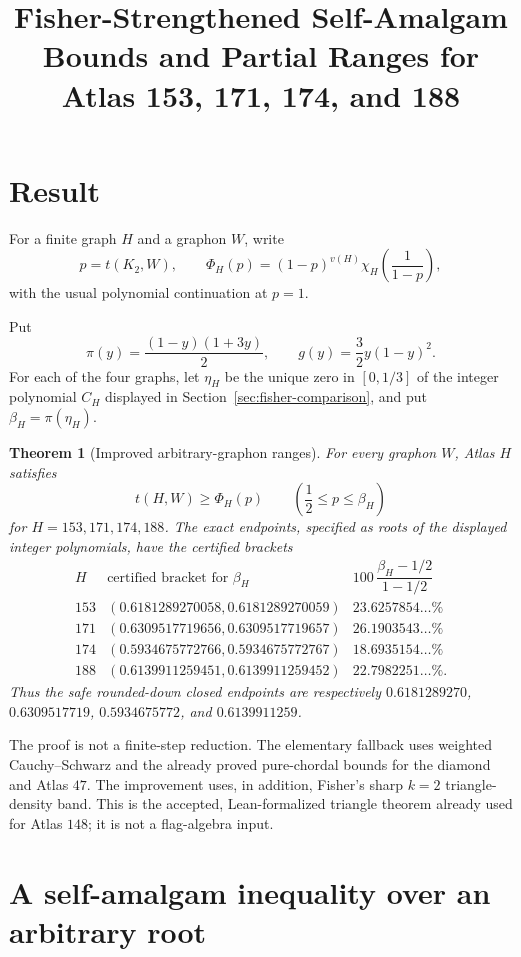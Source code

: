 \documentclass[11pt]{article}
\title{Fisher-Strengthened Self-Amalgam Bounds and Partial Ranges for\\
Atlas 153, 171, 174, and 188}
\author{}
\date{}
\newtheorem{theorem}{Theorem}
\begin{document}
\maketitle

\section{Result}

For a finite graph $H$ and a graphon $W$, write
\[
 p=t(K_2,W),
 \qquad
 \Phi_H(p)=(1-p)^{v(H)}
 \chi_H\!\left(\frac1{1-p}\right),
\]
with the usual polynomial continuation at $p=1$.

Put
\[
 \pi(y)=\frac{(1-y)(1+3y)}2,
 \qquad
 g(y)=\frac32y(1-y)^2.
\]
For each of the four graphs, let $\eta_H$ be the unique zero in
$[0,1/3]$ of the integer polynomial $C_H$ displayed in
Section~\ref{sec:fisher-comparison}, and put $\beta_H=\pi(\eta_H)$.

\begin{theorem}[Improved arbitrary-graphon ranges]\label{thm:main}
For every graphon $W$, Atlas $H$ satisfies
\[
 t(H,W)\geq\Phi_H(p)
 \qquad\left(\frac12\leq p\leq\beta_H\right)
\]
for $H=153,171,174,188$.  The exact endpoints, specified as roots of
the displayed integer polynomials, have the certified brackets
\[
\begin{array}{c|c|c}
H&\text{certified bracket for }\beta_H&
100\,\dfrac{\beta_H-1/2}{1-1/2}\\ \hline
153&(0.6181289270058,0.6181289270059)&23.6257854\ldots\%\\
171&(0.6309517719656,0.6309517719657)&26.1903543\ldots\%\\
174&(0.5934675772766,0.5934675772767)&18.6935154\ldots\%\\
188&(0.6139911259451,0.6139911259452)&22.7982251\ldots\%.
\end{array}
\]
Thus the safe rounded-down closed endpoints are respectively
$0.6181289270$, $0.6309517719$, $0.5934675772$, and $0.6139911259$.
\end{theorem}

The proof is not a finite-step reduction.  The elementary fallback uses
weighted Cauchy--Schwarz and the already proved pure-chordal bounds for the
diamond and Atlas $47$.  The improvement uses, in addition, Fisher's sharp
$k=2$ triangle-density band.  This is the accepted, Lean-formalized
triangle theorem already used for Atlas $148$; it is not a flag-algebra
input.

\section{A self-amalgam inequality over an arbitrary root}
\end{document}
